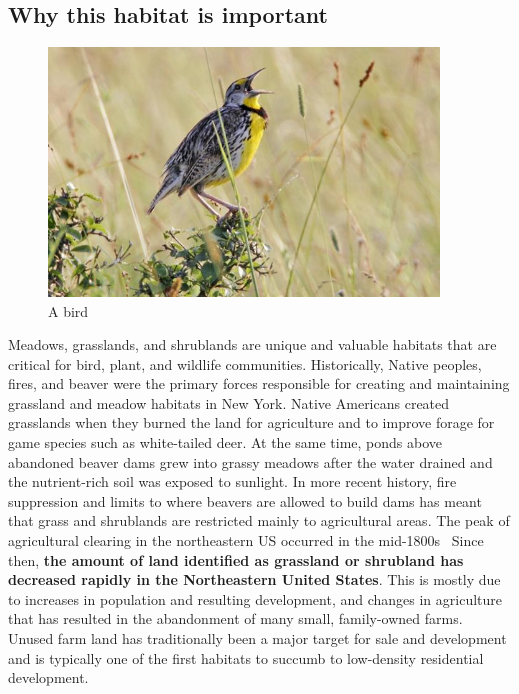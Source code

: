 \subsection*{Why this habitat is important}
\begin{figure}
    \includegraphics[width=10.38cm, keepaspectratio]{images/bird.jpg}
  \caption{A bird}
\end{figure}
Meadows, grasslands, and shrublands are unique and valuable habitats that are
critical for bird, plant, and wildlife communities. Historically, Native
peoples, fires, and beaver were the primary forces responsible for creating and
maintaining grassland and meadow habitats in New York. Native Americans created
grasslands when they burned the land for agriculture and to improve forage for
game species such as white-tailed deer. At the same time, ponds above abandoned
beaver dams grew into grassy meadows after the water drained and the
nutrient-rich soil was exposed to sunlight. In more recent history, fire
suppression and limits to where beavers are allowed to build dams has meant
that grass and shrublands are restricted mainly to agricultural areas. The peak
of agricultural clearing in the northeastern US occurred in the
mid-1800s~\citep{unhextension} Since then, \textbf{the amount of land
identified as grassland or shrubland has decreased rapidly in the
Northeastern United States}. This is mostly due to increases in population and
resulting development, and changes in agriculture that has resulted in the
abandonment of many small, family-owned farms. Unused farm land has
traditionally been a major target for sale and development and is typically one
of the first habitats to succumb to low-density residential development.

